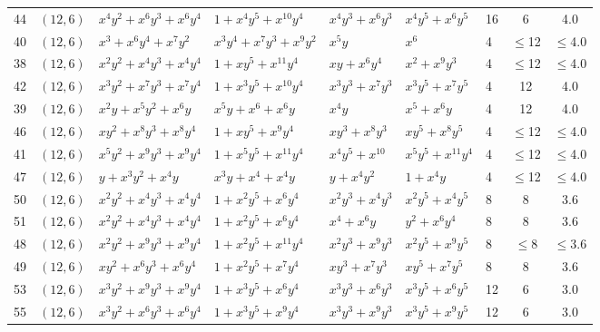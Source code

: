 \begin{table}[t]
\begin{tabular*}{\textwidth}{@{\extracolsep{\fill}}cllllllcc}
44 & $(12,6)$ & $x^{4}y^{2}{+}x^{6}y^{3}{+}x^{6}y^{4}$ & $1{+}x^{4}y^{5}{+}x^{10}y^{4}$ & $x^{4}y^{3}{+}x^{6}y^{3}$ & $x^{4}y^{5}{+}x^{6}y^{5}$ & 16 & 6 & 4.0 \\
40 & $(12,6)$ & $x^{3}{+}x^{6}y^{4}{+}x^{7}y^{2}$ & $x^{3}y^{4}{+}x^{7}y^{3}{+}x^{9}y^{2}$ & $x^{5}y$ & $x^{6}$ & 4 & $\leq$12 & $\leq$4.0 \\
38 & $(12,6)$ & $x^{2}y^{2}{+}x^{4}y^{3}{+}x^{4}y^{4}$ & $1{+}xy^{5}{+}x^{11}y^{4}$ & $xy{+}x^{6}y^{4}$ & $x^{2}{+}x^{9}y^{3}$ & 4 & $\leq$12 & $\leq$4.0 \\
42 & $(12,6)$ & $x^{3}y^{2}{+}x^{7}y^{3}{+}x^{7}y^{4}$ & $1{+}x^{3}y^{5}{+}x^{10}y^{4}$ & $x^{3}y^{3}{+}x^{7}y^{3}$ & $x^{3}y^{5}{+}x^{7}y^{5}$ & 4 & 12 & 4.0 \\
39 & $(12,6)$ & $x^{2}y{+}x^{5}y^{2}{+}x^{6}y$ & $x^{5}y{+}x^{6}{+}x^{6}y$ & $x^{4}y$ & $x^{5}{+}x^{6}y$ & 4 & 12 & 4.0 \\
46 & $(12,6)$ & $xy^{2}{+}x^{8}y^{3}{+}x^{8}y^{4}$ & $1{+}xy^{5}{+}x^{9}y^{4}$ & $xy^{3}{+}x^{8}y^{3}$ & $xy^{5}{+}x^{8}y^{5}$ & 4 & $\leq$12 & $\leq$4.0 \\
41 & $(12,6)$ & $x^{5}y^{2}{+}x^{9}y^{3}{+}x^{9}y^{4}$ & $1{+}x^{5}y^{5}{+}x^{11}y^{4}$ & $x^{4}y^{5}{+}x^{10}$ & $x^{5}y^{5}{+}x^{11}y^{4}$ & 4 & $\leq$12 & $\leq$4.0 \\
47 & $(12,6)$ & $y{+}x^{3}y^{2}{+}x^{4}y$ & $x^{3}y{+}x^{4}{+}x^{4}y$ & $y{+}x^{4}y^{2}$ & $1{+}x^{4}y$ & 4 & $\leq$12 & $\leq$4.0 \\
50 & $(12,6)$ & $x^{2}y^{2}{+}x^{4}y^{3}{+}x^{4}y^{4}$ & $1{+}x^{2}y^{5}{+}x^{6}y^{4}$ & $x^{2}y^{3}{+}x^{4}y^{3}$ & $x^{2}y^{5}{+}x^{4}y^{5}$ & 8 & 8 & 3.6 \\
51 & $(12,6)$ & $x^{2}y^{2}{+}x^{4}y^{3}{+}x^{4}y^{4}$ & $1{+}x^{2}y^{5}{+}x^{6}y^{4}$ & $x^{4}{+}x^{6}y$ & $y^{2}{+}x^{6}y^{4}$ & 8 & 8 & 3.6 \\
48 & $(12,6)$ & $x^{2}y^{2}{+}x^{9}y^{3}{+}x^{9}y^{4}$ & $1{+}x^{2}y^{5}{+}x^{11}y^{4}$ & $x^{2}y^{3}{+}x^{9}y^{3}$ & $x^{2}y^{5}{+}x^{9}y^{5}$ & 8 & $\leq$8 & $\leq$3.6 \\
49 & $(12,6)$ & $xy^{2}{+}x^{6}y^{3}{+}x^{6}y^{4}$ & $1{+}x^{2}y^{5}{+}x^{7}y^{4}$ & $xy^{3}{+}x^{7}y^{3}$ & $xy^{5}{+}x^{7}y^{5}$ & 8 & 8 & 3.6 \\
53 & $(12,6)$ & $x^{3}y^{2}{+}x^{9}y^{3}{+}x^{9}y^{4}$ & $1{+}x^{3}y^{5}{+}x^{6}y^{4}$ & $x^{3}y^{3}{+}x^{6}y^{3}$ & $x^{3}y^{5}{+}x^{6}y^{5}$ & 12 & 6 & 3.0 \\
55 & $(12,6)$ & $x^{3}y^{2}{+}x^{6}y^{3}{+}x^{6}y^{4}$ & $1{+}x^{3}y^{5}{+}x^{9}y^{4}$ & $x^{3}y^{3}{+}x^{9}y^{3}$ & $x^{3}y^{5}{+}x^{9}y^{5}$ & 12 & 6 & 3.0 \\

\end{tabular*}
\end{table}
